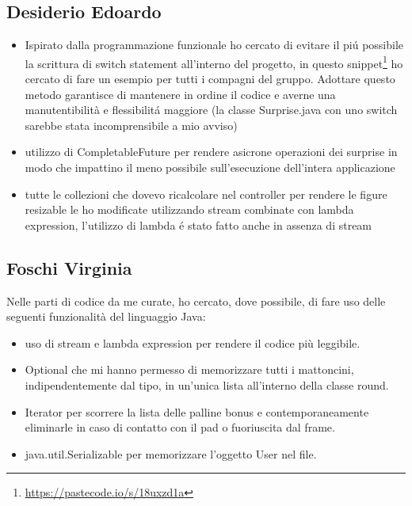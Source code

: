 \documentclass[a4paper,12pt]{report}
\begin{document}
\subsection{Desiderio Edoardo}
\begin{itemize}
    \item Ispirato dalla programmazione funzionale ho cercato di evitare il piú possibile la scrittura di switch
          statement all'interno del progetto, in questo snippet\footnote{\url{https://pastecode.io/s/18uxzd1a}} ho cercato
          di fare un esempio per tutti i compagni del gruppo. Adottare questo metodo garantisce di mantenere in ordine il codice
          e averne una manutentibilità e flessibilitá maggiore (la classe Surprise.java con uno switch sarebbe stata incomprensibile a mio avviso)
    \item utilizzo di CompletableFuture per rendere asicrone operazioni dei surprise in modo che impattino il meno possibile
          sull'esecuzione dell'intera applicazione
    \item tutte le collezioni che dovevo ricalcolare nel controller per rendere le figure resizable le ho modificate
          utilizzando stream combinate con lambda expression, l'utilizzo di lambda é stato fatto  anche in assenza di stream
\end{itemize}
\subsection{Foschi Virginia}
Nelle parti di codice da me curate, ho cercato, dove possibile, di fare uso delle seguenti funzionalità del linguaggio Java:
\begin{itemize}
    \item uso di stream e lambda expression per rendere il codice più leggibile.
    \item Optional che mi hanno permesso di memorizzare tutti i mattoncini, indipendentemente dal tipo, in un'unica lista all'interno della classe round.
    \item Iterator per scorrere la lista delle palline bonus e contemporaneamente eliminarle in caso di contatto con il pad o fuoriuscita dal frame.
    \item java.util.Serializable per memorizzare l'oggetto User nel file.
\end{itemize}
\end{document}
